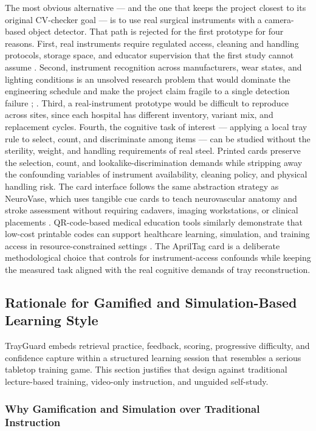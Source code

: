 \documentclass[10pt,a4paper]{article}
\begin{document}
The most obvious alternative — and the one that keeps the project closest to its
original CV-checker goal — is to use real surgical instruments with a
camera-based object detector. That path is rejected for the first prototype for
four reasons. First, real instruments require regulated access, cleaning and
handling protocols, storage space, and educator supervision that the first
study cannot assume \cite{hspa-crcst-accessed-2026}.
Second, instrument recognition across manufacturers, wear states, and lighting
conditions is an unsolved research problem that would dominate the engineering
schedule and make the project claim fragile to a single detection failure
\cite{deol-et-al-2024};
\cite{kienle-et-al-2025}.
Third, a real-instrument prototype would be difficult to reproduce across
sites, since each hospital has different inventory, variant mix, and
replacement cycles. Fourth, the cognitive task of interest — applying a local
tray rule to select, count, and discriminate among items — can be studied
without the sterility, weight, and handling requirements of real steel.
Printed cards preserve the selection, count, and lookalike-discrimination
demands while stripping away the confounding variables of instrument
availability, cleaning policy, and physical handling risk.
The card interface follows the same abstraction strategy as NeuroVase, which
uses tangible cue cards to teach neurovascular anatomy and stroke assessment
without requiring cadavers, imaging workstations, or clinical placements
\cite{jahani-et-al-2026-neurovase}.
QR-code-based medical education tools similarly demonstrate that low-cost
printable codes can support healthcare learning, simulation, and training
access in resource-constrained settings
\cite{karia-et-al-2019}. The AprilTag card is a deliberate methodological choice that controls for
instrument-access confounds while keeping the measured task aligned with the
real cognitive demands of tray reconstruction.
\subsection{Rationale for Gamified and Simulation-Based Learning Style}

TrayGuard embeds retrieval practice, feedback, scoring, progressive difficulty,
and confidence capture within a structured learning session that resembles a
serious tabletop training game. This section justifies that design against
traditional lecture-based training, video-only instruction, and unguided
self-study.
\subsubsection{Why Gamification and Simulation over Traditional Instruction}
\end{document}
